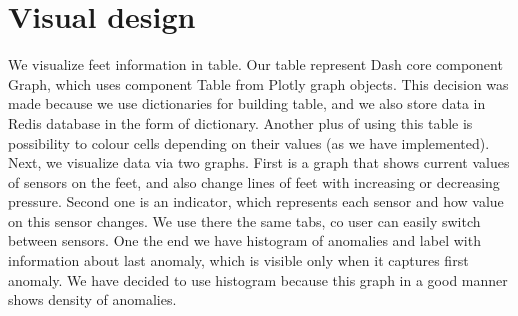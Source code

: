 \documentclass{article}
\begin{document}
\section{Visual design}
We visualize feet information in table. Our table represent Dash core component Graph, which uses component Table from Plotly graph objects. This decision was made because we use dictionaries for building table, and we also store data in Redis database in the form of dictionary. Another plus of using this table is possibility to colour cells depending on their values (as we have implemented).
\newline
Next, we visualize data via two graphs. First is a graph that shows current values of sensors on the feet, and also change lines of feet with increasing or decreasing pressure.
\newline
Second one is an indicator, which represents each sensor and how value on this sensor changes. We use there the same tabs, co user can easily switch between sensors.
\newline
One the end we have histogram of anomalies and label with information about last anomaly, which is visible only when it captures first anomaly. We have decided to use histogram because this graph in a good manner shows density of anomalies.
\end{document}
